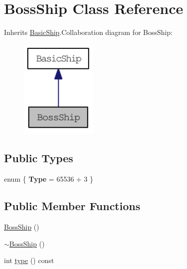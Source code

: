 \hypertarget{class_boss_ship}{
\section{BossShip Class Reference}
\label{class_boss_ship}
}


Inherits \hyperlink{class_basic_ship}{BasicShip}.Collaboration diagram for BossShip:\nopagebreak
\begin{figure}[H]
\begin{center}
\leavevmode
\includegraphics[width=104pt]{class_boss_ship__coll__graph}
\end{center}
\end{figure}
\subsection*{Public Types}
\begin{DoxyCompactItemize}
\item 
enum \{ {\bfseries Type} =  65536 + 3
 \}
\end{DoxyCompactItemize}
\subsection*{Public Member Functions}
\begin{DoxyCompactItemize}
\item 
\hyperlink{class_boss_ship_af7d62c20c5aa3de6435ef0e80351dfb6}{BossShip} ()
\item 
\hyperlink{class_boss_ship_ab3281544fda151089dea661331e57e59}{$\sim$BossShip} ()
\item 
int \hyperlink{class_boss_ship_aa6e1eb6f89978d9608560c8bfacc4906}{type} () const 
\end{DoxyCompactItemize}


